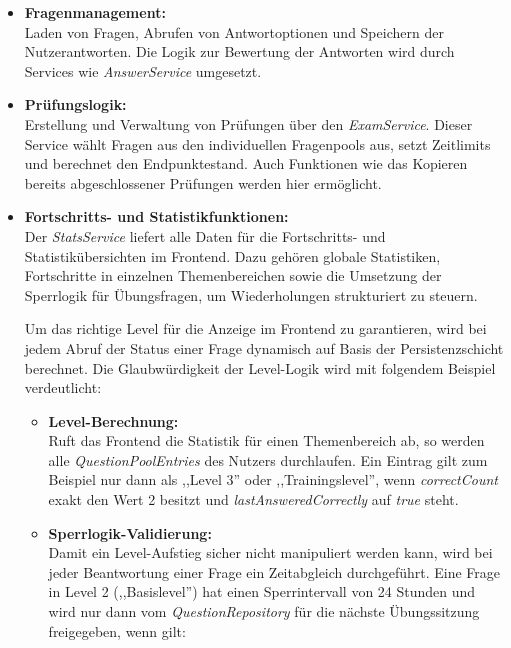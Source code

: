 \begin{itemize}
  \item \textbf{Fragenmanagement:} \\
  Laden von Fragen, Abrufen von Antwortoptionen und Speichern der Nutzerantworten. Die Logik zur Bewertung der Antworten wird durch Services 
  wie \textit{AnswerService} umgesetzt. 

  \item \textbf{Prüfungslogik:} \\
  Erstellung und Verwaltung von Prüfungen über den \textit{ExamService}. Dieser Service wählt Fragen aus den individuellen Fragenpools aus, 
  setzt Zeitlimits und berechnet den Endpunktestand. Auch Funktionen wie das Kopieren bereits abgeschlossener Prüfungen werden hier ermöglicht.

  \item \textbf{Fortschritts- und Statistikfunktionen:} \\
  Der \textit{StatsService} liefert alle Daten für die Fortschritts- und Statistikübersichten im Frontend. Dazu gehören globale Statistiken, 
  Fortschritte in einzelnen Themenbereichen sowie die Umsetzung der Sperrlogik für Übungsfragen, um Wiederholungen strukturiert zu steuern.
  
  Um das richtige Level für die Anzeige im Frontend zu garantieren, wird bei jedem Abruf der Status einer Frage dynamisch auf Basis der Persistenzschicht berechnet. Die Glaubwürdigkeit der Level-Logik wird mit folgendem Beispiel verdeutlicht: 
  
  \begin{itemize}
  	\item \textbf{Level-Berechnung:} \\
  	Ruft das Frontend die Statistik für einen Themenbereich ab, so werden alle \textit{QuestionPoolEntries} des Nutzers durchlaufen. Ein Eintrag gilt zum Beispiel nur dann als ,,Level 3'' oder ,,Trainingslevel'', wenn \textit{correctCount} exakt den Wert 2 besitzt und \textit{lastAnsweredCorrectly} auf \textit{true} steht.
  	
  	\item \textbf{Sperrlogik-Validierung:} \\
  	Damit ein Level-Aufstieg sicher nicht manipuliert werden kann, wird bei jeder Beantwortung einer Frage ein Zeitabgleich durchgeführt. Eine Frage in Level 2 (,,Basislevel'') hat einen Sperrintervall von 24 Stunden und wird nur dann vom \textit{QuestionRepository} für die nächste Übungssitzung freigegeben, wenn gilt: 
  	

\end{itemize}
\end{itemize}
